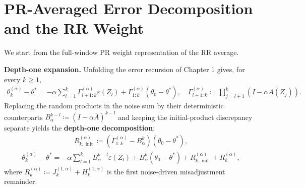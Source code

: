 
\section{PR-Averaged Error Decomposition and the RR Weight}

We start from the full-window PR weight representation of the RR average.

\textbf{Depth-one expansion.} Unfolding the error recursion of Chapter 1
gives, for every \(k \ge 1\),
\begin{equation}
\begin{aligned}
\theta_k^{(\alpha)} - \theta^*
  = -\alpha \sum_{l = 1}^k \Gamma_{l + 1 : k}^{(\alpha)} \varepsilon(Z_l)
    + \Gamma_{1 : k}^{(\alpha)} (\theta_0 - \theta^*),
\quad
\Gamma_{l + 1 : k}^{(\alpha)}
  \coloneqq \prod_{j = l + 1}^k (I - \alpha A(Z_j)).
\end{aligned}
\end{equation}
Replacing the random products in the noise sum by their deterministic
counterparts \(B_\alpha^{k - l} \coloneqq (I - \alpha \overline{A})^{k - l}\) and keeping
the initial-product discrepancy separate yields the \textbf{depth-one decomposition}:
\begin{equation}
\begin{aligned}
R_{k, \operatorname{init}}^{(\alpha)}
  \coloneqq \left(\Gamma_{1 : k}^{(\alpha)} - B_\alpha^k\right) (\theta_0 - \theta^*),
\end{aligned}
\label{eq:init-product-remainder}
\end{equation}
\begin{equation}
\begin{aligned}
\theta_k^{(\alpha)} - \theta^*
  = -\alpha \sum_{l = 1}^k B_\alpha^{k - l} \varepsilon(Z_l)
    + B_\alpha^k (\theta_0 - \theta^*)
    + R_{k, \operatorname{init}}^{(\alpha)}
    + R_k^{(\alpha)},
\end{aligned}
\label{eq:depth-one}
\end{equation}
where \(R_k^{(\alpha)} \coloneqq J_k^{(1, \alpha)} + H_k^{(1, \alpha)}\) is the
first noise-driven misadjustment remainder.


